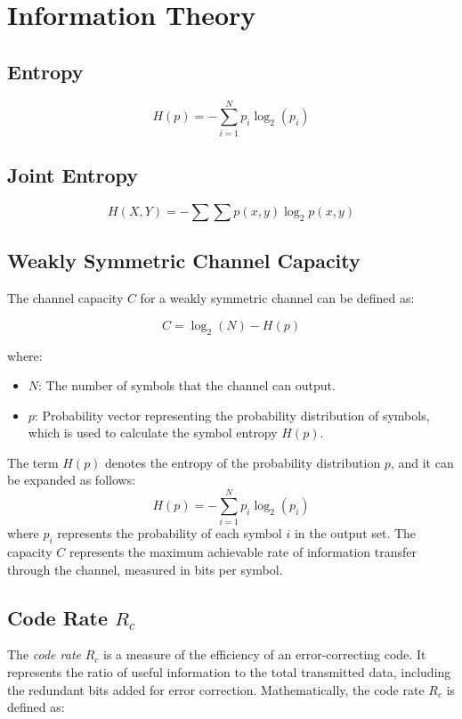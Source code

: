 \documentclass[10pt]{article}
\begin{document}
\section{Information Theory}
\subsection{Entropy}
\[
    H(p) = - \sum_{i=1}^{N} p_i \log_2(p_i)
\]

\subsection{Joint Entropy}
\[
	H(X,Y) = - \sum \sum p(x,y) \log_2 p(x,y)
\]

\subsection{Weakly Symmetric Channel Capacity}

The channel capacity \( C \) for a weakly symmetric channel can be defined as:

\[
    C = \log_2(N) - H(p)
\]

\noindent where:

\begin{itemize}
    \item \( N \): The number of symbols that the channel can output.
    \item \( p \): Probability vector representing the probability distribution of symbols, which is used to calculate the symbol entropy \( H(p) \).
\end{itemize}

The term \( H(p) \) denotes the entropy of the probability distribution \( p \), and it can be expanded as follows:
\[
    H(p) = - \sum_{i=1}^{N} p_i \log_2(p_i)
\]
where $p_i$ represents the probability of each symbol $i$ in the output set. The capacity $C$ represents the maximum achievable rate of information transfer through the channel, measured in bits per symbol.

\subsection{Code Rate \( R_c \)}

The \textit{code rate} \( R_c \) is a measure of the efficiency of an error-correcting code. It represents the ratio of useful information to the total transmitted data, including the redundant bits added for error correction. Mathematically, the code rate \( R_c \) is defined as:
\end{document}
